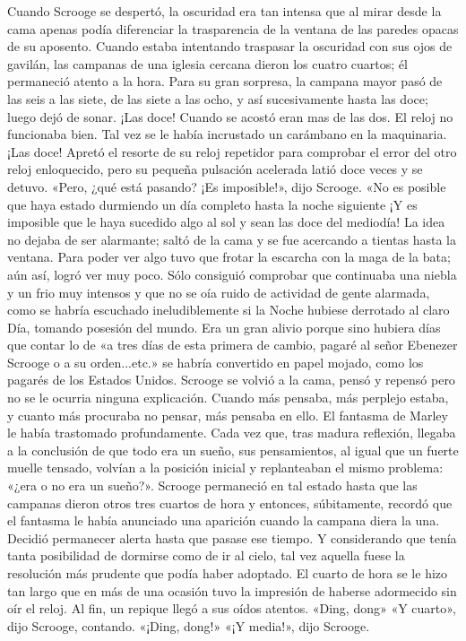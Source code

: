 \documentclass{novela}
\begin{document}
 Cuando Scrooge se despertó, la oscuridad era tan intensa que al mirar desde la cama apenas podía diferenciar la trasparencia de la ventana de las paredes opacas de su aposento. Cuando estaba intentando traspasar la oscuridad con sus ojos de gavilán, las campanas de una iglesia cercana dieron los cuatro cuartos; él permaneció atento a la hora.
 Para su gran sorpresa, la campana mayor pasó de las seis a las siete, de las siete a las ocho, y así sucesivamente hasta las doce; luego dejó de sonar. ¡Las doce! Cuando se acostó eran mas de las dos. El reloj no funcionaba bien. Tal vez se le había incrustado un carámbano en la maquinaria. ¡Las doce!
 Apretó el resorte de su reloj repetidor para comprobar el error del otro reloj enloquecido, pero su pequeña pulsación acelerada latió doce veces y se detuvo.
 «Pero, ¿qué está pasando? ¡Es imposible!», dijo Scrooge. «No es posible que haya estado durmiendo un día completo hasta la noche siguiente ¡Y es imposible que le haya sucedido algo al sol y sean las doce del mediodía!
 La idea no dejaba de ser alarmante; saltó de la cama y se fue acercando a tientas hasta la ventana. Para poder ver algo tuvo que frotar la escarcha con la maga de la bata; aún así, logró ver muy poco. Sólo consiguió comprobar que continuaba una niebla y un frio muy intensos y que no se oía ruido de actividad de gente alarmada, como se habría escuchado ineludiblemente si la Noche hubiese derrotado al claro Día, tomando posesión del mundo. Era un gran alivio porque sino hubiera días que contar lo de «a tres días de esta primera de cambio, pagaré al señor Ebenezer Scrooge o a su orden...etc.» se habría convertido en papel mojado, como los pagarés de los Estados Unidos.
 Scrooge se volvió a la cama, pensó y repensó pero no se le ocurria ninguna explicación. Cuando más pensaba, más perplejo estaba, y cuanto más procuraba no pensar, más pensaba en ello. El fantasma de Marley le había trastomado profundamente. Cada vez que, tras madura reflexión, llegaba a la conclusión de que todo era un sueño, sus pensamientos, al igual que un fuerte muelle tensado, volvían a la posición inicial y replanteaban el mismo problema: «¿era o no era un sueño?».
 Scrooge permaneció en tal estado hasta que las campanas dieron otros tres cuartos de hora y entonces, súbitamente, recordó que el fantasma le había anunciado una aparición cuando la campana diera la una. Decidió permanecer alerta hasta que pasase ese tiempo. Y considerando que tenía tanta posibilidad de dormirse como de ir al cielo, tal vez aquella fuese la resolución más prudente que podía haber adoptado.
 El cuarto de hora se le hizo tan largo que en más de una ocasión tuvo la impresión de haberse adormecido sin oír el reloj. Al fin, un repique llegó a sus oídos atentos.
 «Ding, dong»
 «Y cuarto», dijo Scrooge, contando.
 «¡Ding, dong!»
 «¡Y media!», dijo Scrooge.
\end{document}
